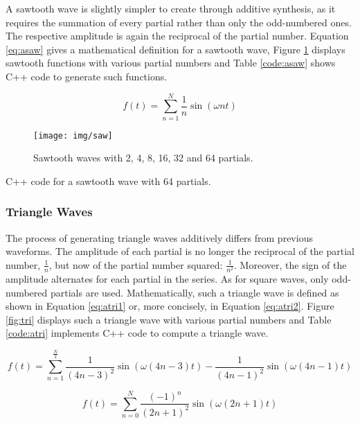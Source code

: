 A sawtooth wave is slightly simpler to create through additive synthesis, as it requires the summation of every partial rather than only the odd-numbered ones. The respective amplitude is again the reciprocal of the partial number. Equation \ref{eq:asaw} gives a mathematical definition for a sawtooth wave, Figure \ref{fig:saw} displays sawtooth functions with various partial numbers and Table \ref{code:asaw} shows C++ code to generate such functions.

\begin{equation}
  f(t) = \sum\limits_{n=1}^N \frac{1}{n} \sin(\omega n t)
  \label{eq:asaw}
\end{equation}

\begin{figure}
  \texttt{[image: img/saw]}
  \caption{Sawtooth waves with 2, 4, 8, 16, 32 and 64 partials.}
  \label{fig:saw}
\end{figure}

\begin{table}
  \caption{C++ code for a sawtooth wave with 64 partials.}
  \label{code:asaw}
\end{table}

\pagebreak

\subsubsection{Triangle Waves}

The process of generating triangle waves additively differs from previous waveforms. The amplitude of each partial is no longer the reciprocal of the partial number, $\frac{1}{n}$, but now of the partial number squared: $\frac{1}{n^2}$. Moreover, the sign of the amplitude alternates for each partial in the series. As for square waves, only odd-numbered partials are used. Mathematically, such a triangle wave is defined as shown in Equation \ref{eq:atri1} or, more concisely, in Equation \ref{eq:atri2}. Figure \ref{fig:tri} displays such a triangle wave with various partial numbers and Table \ref{code:atri} implements C++ code to compute a triangle wave.

\begin{equation}
  f(t) = \sum\limits_{n=1}^\frac{N}{2} \frac{1}{(4n-3)^2}\sin(\omega (4n-3) t) - \frac{1}{(4n-1)^2}\sin(\omega (4n-1) t)
  \label{eq:atri1}
\end{equation}

\begin{equation}
  f(t) = \sum\limits_{n=0}^N \frac{(-1)^n}{(2n+1)^2} \sin(\omega (2n + 1) t)
  \label{eq:atri2}
\end{equation}

